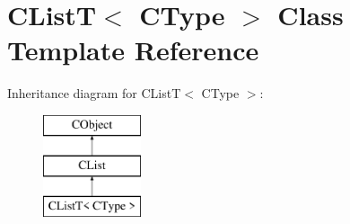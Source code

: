 \hypertarget{class_c_list_t}{\section{C\-List\-T$<$ C\-Type $>$ Class Template Reference}
\label{class_c_list_t}
}
Inheritance diagram for C\-List\-T$<$ C\-Type $>$\-:\begin{figure}[H]
\begin{center}
\leavevmode
\includegraphics[height=3.000000cm]{class_c_list_t}
\end{center}
\end{figure}
